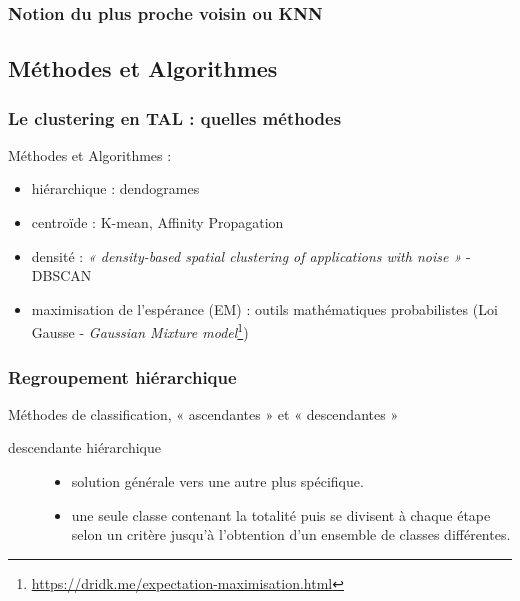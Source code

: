 \begin{frame}
  \frametitle{Notion du plus proche voisin ou KNN}
  
\end{frame}

\subsection{Méthodes et Algorithmes}
\begin{frame}
  \frametitle{Le clustering en TAL : quelles méthodes}
 Méthodes et Algorithmes :
  \begin{itemize}
  \item {} hiérarchique : dendogrames
  \item {} centroïde : K-mean, Affinity Propagation
  \item {} densité : \textit{« density-based spatial clustering of applications with noise »} - DBSCAN
  \item {} maximisation de l’espérance (EM) : outils mathématiques probabilistes (Loi Gausse - \textit{Gaussian Mixture model}\footnote{\url{https://dridk.me/expectation-maximisation.html}})
  \end{itemize}
  

  
\end{frame}

\begin{frame}
  \frametitle{Regroupement hiérarchique}
  
  Méthodes de classification, « ascendantes » et « descendantes »
\begin{description}
\item  [descendante hiérarchique] 
\begin{itemize}
\item {} solution générale vers une autre plus spécifique.
\item {} une seule classe contenant la totalité puis se divisent à chaque étape selon un critère jusqu’à l’obtention d’un ensemble de classes différentes.
\end{itemize}
\end{description} 
\end{frame}

